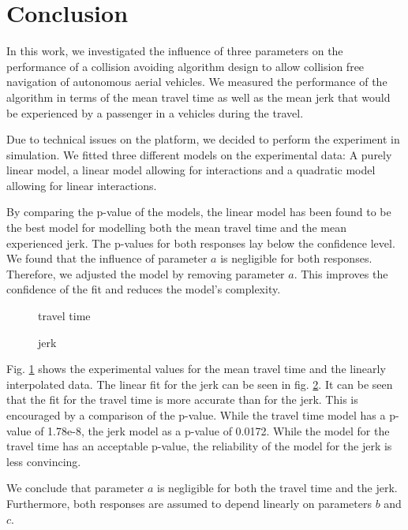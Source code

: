 \section{Conclusion}

In this work, we investigated the influence of three parameters on the performance of a collision avoiding algorithm design to allow collision free navigation of autonomous aerial vehicles. We measured the performance of the algorithm in terms of the mean travel time as well as the mean jerk that would be experienced by a passenger in a vehicles during the travel.

Due to technical issues on the platform, we decided to perform the experiment in simulation.
We fitted three different models on the experimental data: A purely linear model, a linear model allowing for interactions and a quadratic model allowing for linear interactions.

By comparing the p-value of the models, the linear model has been found to be the best model for modelling both the mean travel time and the mean experienced jerk. The p-values for both responses lay below the confidence level. We found that the influence of parameter $a$ is negligible for both responses. Therefore, we adjusted the model by removing parameter $a$. This improves the confidence of the fit and reduces the model's complexity.

\begin{figure}[h]
	\centering
		\setlength{\figH}{0.23\textwidth}
		
		\caption{travel time}\label{fig:concl_time}
\end{figure}	
\begin{figure}
    		\centering
		\setlength{\figH}{0.23\textwidth}		
		
		\caption{jerk}\label{fig:concl_jerk}
\end{figure}

Fig. \ref{fig:concl_time} shows the experimental values for the mean travel time and the linearly interpolated data. The linear fit for the jerk can be seen in fig. \ref{fig:concl_jerk}. It can be seen that the fit for the travel time is more accurate than for the jerk. This is encouraged by a comparison of the p-value. While the travel time model has a p-value of 1.78e-8, the jerk model as a p-value of 0.0172. While the model for the travel time has an acceptable p-value, the reliability of the model for the jerk is less convincing.

We conclude that parameter $a$ is negligible for both the travel time and the jerk. Furthermore, both responses are assumed to depend linearly on parameters $b$ and $c$.